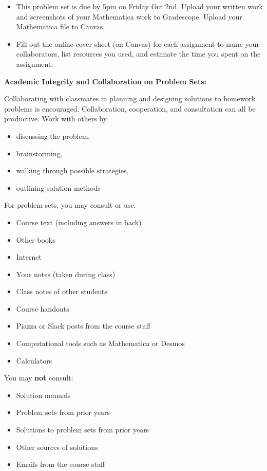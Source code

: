 \documentclass[12pt,letterpaper,noanswers]{exam}
\begin{document}
 \pdfpageheight 11in 
  \pdfpagewidth 8.5in
\begin{itemize}
\item This problem set is due by 5pm on Friday Oct 2nd.  Upload your written work and screenshots of your Mathematica work to Gradescope.  Upload your Mathematica file to Canvas.
\item Fill out the online cover sheet (on Canvas) for each assignment to name your collaborators, list resources you used, and estimate the time you spent on the assignment.
\end{itemize}

\noindent\textbf{Academic Integrity and Collaboration on Problem Sets:}  

Collaborating with classmates in planning and designing solutions to homework problems is encouraged.  Collaboration, cooperation, and consultation can all be productive.  Work with others by 
\begin{multicols}{2}
\begin{itemize}
\itemsep-0.2em
    \item discussing the problem,
    \item brainstorming,
    \item walking through possible strategies,
    \item outlining solution methods
\end{itemize}   
\end{multicols}

\noindent For problem sets, you may consult or use:
\begin{multicols}{2}
\begin{itemize}
\itemsep-0.2em
    \item Course text (including answers in back)
    \item Other books
    \item Internet
    \item Your notes (taken during class)
    \item Class notes of other students
    \item Course handouts
    \item Piazza or Slack posts from the course staff
    \item Computational tools such as Mathematica or Desmos
    \item Calculators
\end{itemize}
\end{multicols}

\noindent You may \textbf{not} consult:
\begin{multicols}{2}
\begin{itemize}
\itemsep-0.2em
    \item Solution manuals
    \item Problem sets from prior years
    \item Solutions to problem sets from prior years
    \item Other sources of solutions
    \item Emails from the course staff
\end{itemize}
\end{multicols}
\end{document}

